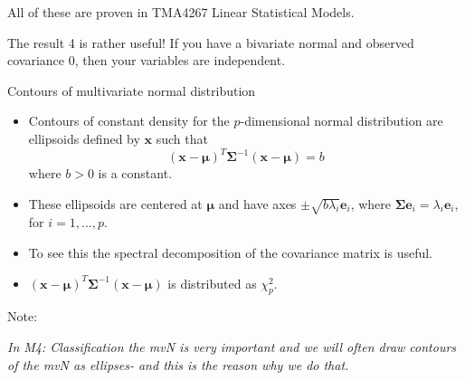 \documentclass[ignorenonframetext,]{beamer}
\begin{document}
\begin{frame}

All of these are proven in TMA4267 Linear Statistical Models.

The result 4 is rather useful! If you have a bivariate normal and
observed covariance 0, then your variables are independent.

\end{frame}

\begin{frame}

\begin{block}{Contours of multivariate normal distribution}

\vspace{2mm}

\begin{itemize}
\item
  Contours of constant density for the \(p\)-dimensional normal
  distribution are ellipsoids defined by \(\boldsymbol{x}\) such that
  \[ (\boldsymbol{x}-\boldsymbol{\mu})^T\boldsymbol\Sigma^{-1}(\boldsymbol{x}-\boldsymbol{\mu})=b \]
  where \(b>0\) is a constant.
\item
  These ellipsoids are centered at \(\boldsymbol{\mu}\) and have axes
  \(\pm \sqrt{b \lambda_i}\boldsymbol{e}_i\), where
  \(\boldsymbol\Sigma\boldsymbol{e}_i=\lambda_i \boldsymbol{e}_i\), for
  \(i=1,...,p\).
\item
  To see this the spectral decomposition of the covariance matrix is
  useful.
\item
  \((\boldsymbol{x}-\boldsymbol{\mu})^T\boldsymbol\Sigma^{-1}(\boldsymbol{x}-\boldsymbol{\mu})\)
  is distributed as \(\chi^2_p\).
\end{itemize}

\end{block}

\end{frame}

\begin{frame}

Note:

\emph{In M4: Classification the mvN is very important and we will often
draw contours of the mvN as ellipses- and this is the reason why we do
that. }

\end{frame}
\end{document}
